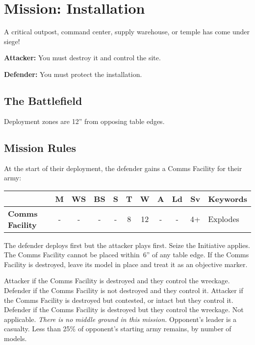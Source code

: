 \clearpage
\section{Mission: Installation}

  A critical outpost, command center, supply warehouse, or temple has
  come under siege!
  \begin{squishitemize}    
\item {\bf Attacker:} You must destroy it and control the site.

\item {\bf Defender:} You must protect the installation.
  \end{squishitemize}

\subsection{\bf The Battlefield}%

Deployment zones are 12'' from opposing table edges.

\subsection{\bf Mission Rules}%

At the start of their deployment, the defender gains a Comms Facility
for their army:

\vspace*{-9pt}
\begin{center}
  \begin{tabular}[t]{O{1.5in}cccccccccE{2.5in}}
    & {\bf M} & {\bf WS} &  {\bf BS} & {\bf S} & {\bf T} & {\bf W} & {\bf A} & {\bf Ld} & {\bf Sv} & {\bf Keywords}\\
\hline
    {\bf Comms Facility} & - & - & - & - & 8 & 12 & - & - & 4+ & Explodes\\
  \end{tabular}
  \end{center}

  The defender deploys first but the attacker plays first.  Seize the
  Initiative applies.  The Comms Facility cannot be placed within~6''
  of any table edge.  If the Comms Facility is destroyed, leave its
  model in place and treat it as an objective marker.



\vfill
\scoringbox%
{Attacker if the Comms Facility is destroyed and they control the wreckage.
  Defender if the Comms Facility is not destroyed and they control it.}%
{Attacker if the Comms Facility is destroyed but contested, or intact but
  they control it.  Defender if the Comms Facility is destroyed but they
  control the wreckage.}%
{Not applicable.  \emph{There is no middle ground in this mission.}}%
{Opponent's leader is a casualty.}%
{Less than 25\% of opponent's starting army remains, by
  number of models.}
